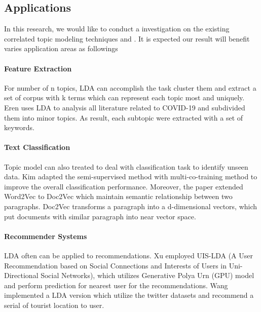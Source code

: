 \subsection{Applications}
In this research, we would like to conduct a investigation on the existing correlated topic modeling techniques and . It is expected our result will benefit varies application areas as followings 
\paragraph{Feature Extraction}\label{AAA} For number of n topics, LDA can accomplish the task cluster them and extract a set of corpus with k terms which can represent each topic most and uniquely. Eren \cite{eren_covid-19_2020} uses LDA to analysis all literature related to COVID-19 and subdivided them into minor topics. As result, each subtopic were extracted with a set of keywords.
\paragraph{Text Classification}Topic model can also treated to deal with classification task to identify unseen data. Kim \cite{kim_multi-co-training_2019} adapted the semi-supervised method with multi-co-training method to improve the overall classification performance. Moreover, the paper extended Word2Vec to Doc2Vec which maintain semantic relationship between two paragraphs. Doc2Vec transforms a paragraph into a d-dimensional vectors, which put documents with similar paragraph into near vector space.
\paragraph{Recommender Systems} LDA often can be applied to recommendations. Xu\cite{xu_uis-lda_2017} employed UIS-LDA (A User Recommendation based on Social Connections and Interests of Users in Uni-Directional Social Networks), which utilizes Generative Polya Urn (GPU) model and perform prediction for nearest user for the recommendations. Wang \cite{wang_st-sage_2017} implemented a LDA version which utilize the twitter datasets and recommend a serial of tourist location to user.

